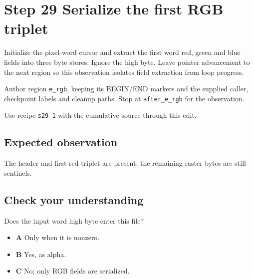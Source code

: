 \section{Step 29 Serialize the first RGB triplet}\label{ppm-s29}

Initialize the pixel-word cursor and extract the first word red, green and blue fields into three byte stores. Ignore the high byte. Leave pointer advancement to the next region so this observation isolates field extraction from loop progress.

Author region \texttt{e\_rgb}, keeping its BEGIN/END markers and the supplied caller, checkpoint labels and cleanup paths. Stop at \texttt{after\_e\_rgb} for the observation.

Use recipe \texttt{s29-1} with the cumulative source through this edit.

\subsection{Expected observation}
The header and first red triplet are present; the remaining raster bytes are still sentinels.

\subsection{Check your understanding}
Does the input word high byte enter this file?

\begin{itemize}
  \item \textbf{A} Only when it is nonzero.
  \item \textbf{B} Yes, as alpha.
  \item \textbf{C} No; only RGB fields are serialized.
\end{itemize}
